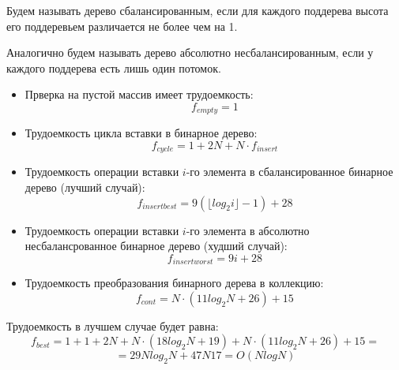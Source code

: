 Будем называть дерево сбалансированным, если для каждого поддерева
высота его поддеревьем различается не более чем на 1.


Аналогично будем называть дерево абсолютно несбалансированным, если у каждого
поддерева есть лишь один потомок.

\begin{itemize}
    \item Прверка на пустой массив имеет трудоемкость:
    \begin{equation}
        \label{for::binary_tree_empty}
        f_{empty} = 1
    \end{equation}
    \item Трудоемкость цикла вставки в бинарное дерево:
    \begin{equation}
        \label{for::binary_tree_insert_cycle}
        f_{cycle} = 1 + 2N + N \cdot f_{insert}
    \end{equation}
    \item Трудоемкость операции вставки $i$-го элемента в сбалансированное бинарное дерево (лучший случай):
    \begin{equation}
        \label{for::binary_tree_insert_best_case}
        f_{insert best} = 9(\lfloor{log_2 i}\rfloor - 1) + 28
    \end{equation}
    \item Трудоемкость операции вставки $i$-го элемента в абсолютно несбалансрованное бинарное дерево (худший случай):
    \begin{equation}
        \label{for::binary_tree_insert_worst_case}
        f_{insert worst} = 9i + 28
    \end{equation}
    \item Трудоемкость преобразования бинарного дерева в коллекцию:
    \begin{equation}
        \label{for::binary_tree_to_container}
        f_{cont} = N \cdot (11 log_2 N  + 26)  + 15
    \end{equation}
\end{itemize}

Трудоемкость в лучшем случае будет равна:
\begin{equation}
    \label{for:binary_tree_best_1}
    f_{best} = 1 + 1 + 2N + N \cdot (18 log_2 N + 19) + N \cdot (11 log_2 N  + 26)  + 15 =
\end{equation}
\begin{equation}
    \label{for:binary_tree_best_2}
    = 29 N log_2 N + 47N 17 = O(N log N)
\end{equation}

